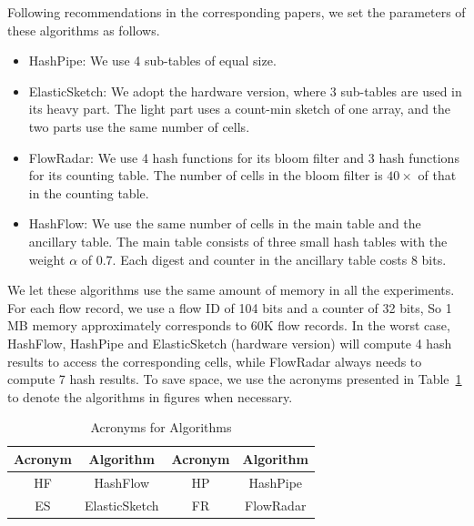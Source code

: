 Following recommendations in the corresponding papers, we set the parameters of these algorithms as follows. 
\begin{itemize}
    \item HashPipe: We use 4 sub-tables of equal size.
    \item ElasticSketch: We adopt the hardware version, where 3 sub-tables
are used in its heavy part. The light part uses a count-min sketch of one array, 
and the two parts use the same number of cells.
    \item FlowRadar:  We use 4 hash functions for its bloom filter and 3 hash functions for its counting table.
The number of cells in the bloom filter is $40\times$ of that in the counting table. 
    \item HashFlow: We use the same number of cells in the main table and the ancillary table. 
The main table consists of three small hash tables with the weight $\alpha$ of 0.7. 
Each digest and counter in the ancillary table costs 8 bits.
\end{itemize}

We let these algorithms use the same amount of memory in all the experiments. 
For each flow record, we use a flow ID of 104 bits and a counter of 32 bits,
So 1 MB memory approximately corresponds to 60K flow records.
In the worst case, HashFlow, HashPipe and ElasticSketch (hardware version) will compute 4 hash results 
to access the corresponding cells, while FlowRadar always needs to compute 7 hash results. To save space, we use the acronyms presented in Table~\ref{table:acronyms} to denote the algorithms in figures when necessary. 

\begin{table}[ht!]
	\centering
	\caption{Acronyms for Algorithms}
	\label{table:acronyms}
	\begin{tabular} { c | c | c | c}
	\hline\hline
	Acronym & Algorithm & Acronym & Algorithm\\
	\hline
	HF & HashFlow & HP & HashPipe\\
	ES & ElasticSketch & FR & FlowRadar\\
	\hline%
	\end{tabular}
\end{table}







